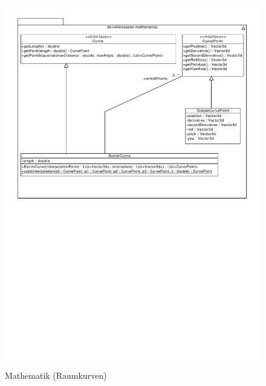 \begin{figure}
\includegraphics[width=\linewidth]{bilder/Mathematics}
\caption{Mathematik (Raumkurven)}
\label{fig:mathematics}
\end{figure}
